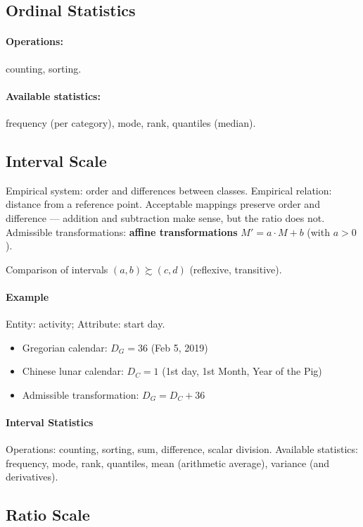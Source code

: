 \subsection{Ordinal Statistics}

\paragraph{Operations:} counting, sorting.
\paragraph{Available statistics:} frequency (per category), mode, rank,
quantiles (median).

\subsection{Interval Scale}

Empirical system: order and differences between classes.
Empirical relation: distance from a reference point.
Acceptable mappings preserve order and difference — addition and subtraction make sense,
but the ratio does not.
Admissible transformations: \textbf{affine transformations} $M' = a \cdot M + b$ (with $a > 0$).

Comparison of intervals $(a, b) \succsim (c, d)$ (reflexive, transitive).

\paragraph{Example}
Entity: activity; Attribute: start day.
\begin{itemize}
  \item Gregorian calendar: $D_G = 36$ (Feb 5, 2019)
  \item Chinese lunar calendar: $D_C = 1$ (1st day, 1st Month, Year of the Pig)
  \item Admissible transformation: $D_G = D_C + 36$
\end{itemize}

\paragraph{Interval Statistics}
Operations: counting, sorting, sum, difference, scalar division.
Available statistics: frequency, mode, rank, quantiles, mean (arithmetic average), variance
(and derivatives).

\subsection{Ratio Scale}

